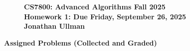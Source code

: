 \documentclass[11pt]{article}
\theoremstyle{definition}
\newcommand{\HWtitle}[2]{\begin{figure}[t!]{\bfseries \Large \color{DarkBlue}  \noindent CS7800: Advanced Algorithms \hfill Fall 2025} \\[0.2em] {\bfseries \Large \color{DarkBlue} Homework #1: Due {#2}} \\[1em] {\bfseries \large Jonathan Ullman}\\[1ex] \end{figure}}
\begin{document}

\HWtitle{1}{Friday, September 26, 2025}


\renewcommand{\labelenumii}{{\bfseries \em \arabic{enumi}.\arabic{enumii}}}
\newcommand{\problemitem}{\renewcommand{\labelenumi}{{\bfseries \em Problem \arabic{enumi}}}\item}
\newcommand{\solutionitem}{\renewcommand{\labelenumi}{{\bfseries \em Solution \arabic{enumi}}}\addtocounter{enumi}{-1}\item}

%

\noindent\textbf{\color{blue} \Large Assigned Problems (Collected and Graded)}
\end{document}
